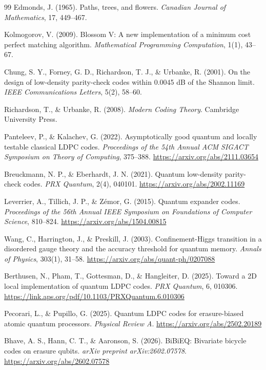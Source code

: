\documentclass[twocolumn,10pt]{article}
\begin{document}
\begin{thebibliography}{99}
Edmonds, J. (1965).
Paths, trees, and flowers.
\textit{Canadian Journal of Mathematics}, 17, 449--467.

Kolmogorov, V. (2009).
Blossom V: A new implementation of a minimum cost perfect matching algorithm.
\textit{Mathematical Programming Computation}, 1(1), 43--67.

Chung, S. Y., Forney, G. D., Richardson, T. J., \& Urbanke, R. (2001).
On the design of low-density parity-check codes within 0.0045 dB of the Shannon limit.
\textit{IEEE Communications Letters}, 5(2), 58--60.

Richardson, T., \& Urbanke, R. (2008).
\textit{Modern Coding Theory}.
Cambridge University Press.

Panteleev, P., \& Kalachev, G. (2022).
Asymptotically good quantum and locally testable classical LDPC codes.
\textit{Proceedings of the 54th Annual ACM SIGACT Symposium on Theory of Computing}, 375--388.
\url{https://arxiv.org/abs/2111.03654}

Breuckmann, N. P., \& Eberhardt, J. N. (2021).
Quantum low-density parity-check codes.
\textit{PRX Quantum}, 2(4), 040101.
\url{https://arxiv.org/abs/2002.11169}

Leverrier, A., Tillich, J. P., \& Z\'emor, G. (2015).
Quantum expander codes.
\textit{Proceedings of the 56th Annual IEEE Symposium on Foundations of Computer Science}, 810--824.
\url{https://arxiv.org/abs/1504.00815}

Wang, C., Harrington, J., \& Preskill, J. (2003).
Confinement-Higgs transition in a disordered gauge theory and the accuracy threshold for quantum memory.
\textit{Annals of Physics}, 303(1), 31--58.
\url{https://arxiv.org/abs/quant-ph/0207088}

Berthusen, N., Pham, T., Gottesman, D., \& Hangleiter, D. (2025).
Toward a 2D local implementation of quantum LDPC codes.
\textit{PRX Quantum}, 6, 010306.
\url{https://link.aps.org/pdf/10.1103/PRXQuantum.6.010306}

Pecorari, L., \& Pupillo, G. (2025).
Quantum LDPC codes for erasure-biased atomic quantum processors.
\textit{Physical Review A}.
\url{https://arxiv.org/abs/2502.20189}

Bhave, A. S., Hann, C. T., \& Aaronson, S. (2026).
BiBiEQ: Bivariate bicycle codes on erasure qubits.
\textit{arXiv preprint arXiv:2602.07578}.
\url{https://arxiv.org/abs/2602.07578}


\end{thebibliography}
\end{document}
